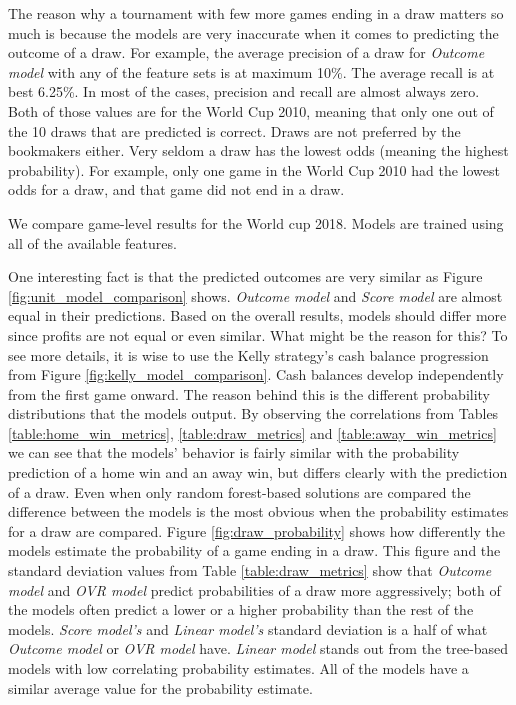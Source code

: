 The reason why a tournament with few more games ending in a draw matters so much is because the models are very inaccurate when it comes to predicting the outcome of a draw. For example, the average precision of a draw for \textit{Outcome model} with any of the feature sets is at maximum 10\%. The average recall is at best 6.25\%. In most of the cases, precision and recall are almost always zero. Both of those values are for the World Cup 2010, meaning that only one out of the 10 draws that are predicted is correct. Draws are not preferred by the bookmakers either. Very seldom a draw has the lowest odds (meaning the highest probability). For example, only one game in the World Cup 2010 had the lowest odds for a draw, and that game did not end in a draw.

We compare game-level results for the World cup 2018. Models are trained using all of the available features.

One interesting fact is that the predicted outcomes are very similar as Figure \ref{fig:unit_model_comparison} shows. \textit{Outcome model} and \textit{Score model} are almost equal in their predictions. Based on the overall results, models should differ more since profits are not equal or even similar. What might be the reason for this? To see more details, it is wise to use the Kelly strategy's cash balance progression from Figure \ref{fig:kelly_model_comparison}. Cash balances develop independently from the first game onward. The reason behind this is the different probability distributions that the models output. By observing the correlations from Tables \ref{table:home_win_metrics}, \ref{table:draw_metrics} and \ref{table:away_win_metrics} we can see that the models' behavior is fairly similar with the probability prediction of a home win and an away win, but differs clearly with the prediction of a draw. Even when only random forest-based solutions are compared the difference between the models is the most obvious when the probability estimates for a draw are compared. Figure \ref{fig:draw_probability} shows how differently the models estimate the probability of a game ending in a draw. This figure and the standard deviation values from Table \ref{table:draw_metrics} show that \textit{Outcome model} and \textit{OVR model} predict probabilities of a draw more aggressively; both of the models often predict a lower or a higher probability than the rest of the models. \textit{Score model's} and \textit{Linear model's} standard deviation is a half of what \textit{Outcome model} or \textit{OVR model} have. \textit{Linear model} stands out from the tree-based models with low correlating probability estimates. All of the models have a similar average value for the probability estimate.

